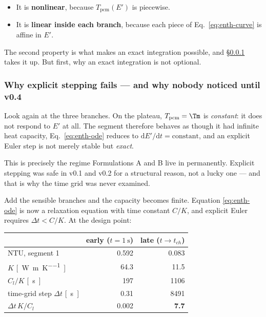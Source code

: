 \begin{itemize}[leftmargin=1.5em,itemsep=2pt]
\item It is \textbf{nonlinear}, because $T_{\mathrm{pcm}}(E')$ is piecewise.
\item It is \textbf{linear inside each branch}, because each piece of
  Eq.~\eqref{eq:enth-curve} is affine in $E'$.
\end{itemize}

\noindent
The second property is what makes an exact integration possible, and
\S\ref{sec:front:integration} takes it up. But first, why an exact integration
is not optional.

\subsubsection{Why explicit stepping fails --- and why nobody noticed until v0.4}
\label{sec:front:integration}

Look again at the three branches. On the plateau, $T_{\mathrm{pcm}}=\Tm$ is
\emph{constant}: it does not respond to $E'$ at all. The segment therefore
behaves as though it had infinite heat capacity, Eq.~\eqref{eq:enth-ode} reduces
to $\mathrm{d}E'/\mathrm{d}t = \text{constant}$, and an explicit Euler step is
not merely stable but \emph{exact}.

This is precisely the regime Formulations A and B live in permanently. Explicit
stepping was safe in v0.1 and v0.2 for a structural reason, not a lucky one ---
and that is why the time grid was never examined.

Add the sensible branches and the capacity becomes finite. Equation
\eqref{eq:enth-ode} is now a relaxation equation with time constant $C/K$, and
explicit Euler requires $\Delta t < C/K$. At the design point:

\begin{center}
\begin{tabular}{@{}l r r@{}}
\toprule
 & early ($t=\SI{1}{\second}$) & late ($t\to t_{ch}$) \\
\midrule
$\mathrm{NTU}$, segment 1        & \num{0.592}  & \num{0.083} \\
$K$ \si{[\watt\per\meter\per\kelvin]} & \num{64.3} & \num{11.5} \\
$C_{l}/K$ \si{[\second]}         & \num{197}    & \num{1106}  \\
time-grid step $\Delta t$ \si{[\second]} & \num{0.31} & \num{8491} \\
\midrule
$\Delta t\,K/C_{l}$              & \num{0.002}  & \textbf{\num{7.7}} \\
\bottomrule
\end{tabular}
\end{center}

